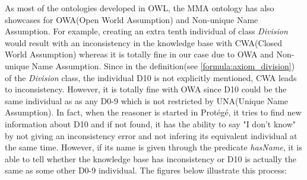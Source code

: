 \documentclass[a4paper]{article}
\begin{document}
As most of the ontologies developed in OWL, the MMA ontology has also showcases for OWA(Open World Assumption) and Non-unique Name Assumption. For example, creating an extra tenth individual 
of class \textit{Division} would result with an inconsistency in the knowledge base with CWA(Closed World Assumption) whereas it is totally fine in our case due to OWA and Non-unique Name Assumption.
Since in the definition(see \ref{formula:axiom_division}) of the \textit{Division} class, the individual D10 is not explicitly mentioned, CWA leads to inconsistency. However, it is totally fine with 
OWA since D10 could be the same individual as as any D0-9 which is not restricted by UNA(Unique Name Assumption). In fact, when the reasoner is started in Prot\'eg\'e, it tries to find new 
information about D10 and if not found, it has the ability to say "I don't know" by not giving an inconsistency error and not infering its equivalent individual at the same time. However, if its 
name is given through the predicate \textit{hasName}, it is able to tell whether the knowledge base has inconsistency or D10 is actually the same as some other D0-9 individual. The figures below 
illustrate this process:
\end{document}
